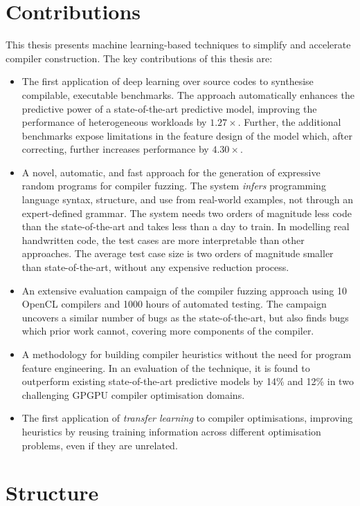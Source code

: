 \section{Contributions}

This thesis presents machine learning-based techniques to simplify and accelerate compiler construction. The key contributions of this thesis are:

\begin{itemize}
  \item The first application of deep learning over source codes to synthesise compilable, executable benchmarks. The approach automatically enhances the predictive power of a state-of-the-art predictive model, improving the performance of heterogeneous workloads by $1.27\times$. Further, the additional benchmarks expose limitations in the feature design of the model which, after correcting, further increases performance by $4.30\times$.
  \item A novel, automatic, and fast approach for the generation of expressive random programs for compiler fuzzing. The system \emph{infers} programming language syntax, structure, and use from real-world examples, not through an expert-defined grammar. The system needs two orders of magnitude less code than the state-of-the-art and takes less than a day to train. In modelling real handwritten code, the test cases are more interpretable than other approaches. The average test case size is two orders of magnitude smaller than state-of-the-art, without any expensive reduction process.
  \item An extensive evaluation campaign of the compiler fuzzing approach using 10 OpenCL compilers and 1000 hours of automated testing. The campaign uncovers a similar number of bugs as the state-of-the-art, but also finds bugs which prior work cannot, covering more components of the compiler.
	\item A methodology for building compiler heuristics without the need for program feature engineering. In an evaluation of the technique, it is found to outperform existing state-of-the-art predictive models by 14\% and 12\% in two challenging GPGPU compiler optimisation domains.
	\item The first application of \emph{transfer learning} to compiler optimisations, improving heuristics by reusing training information across different optimisation problems, even if they are unrelated.
\end{itemize}

\newpage
\section{Structure}

